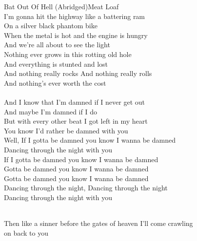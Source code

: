 \documentclass[a4paper,11pt]{article}
\begin{document}
\begin{song}{Bat Out Of Hell (Abridged)}{Meat Loaf}
 \\
I'm gonna hit the highway like a battering ram \\
On a silver black phantom bike \\
When the metal is hot and the engine is hungry \\
And we're all about to see the light \\
Nothing ever grows in this rotting old hole \\
And everything is stunted and lost \\
And nothing really rocks And nothing really rolls \\
And nothing's ever worth the cost\\
\\
And I know that I'm damned if I never get out \\
And maybe I'm damned if I do \\
But with every other beat I got left in my heart \\
You know I'd rather be damned with you\\ 
Well, If I gotta be damned you know I wanna be damned \\
Dancing through the night with you \\
If I gotta be damned you know I wanna be damned \\
Gotta be damned you know I wanna be damned \\
Gotta be damned you know I wanna be damned \\
Dancing through the night, Dancing through the night\\ 
 Dancing through the night with you \\
     \\

Then like a sinner before the gates of heaven I'll come crawling\\ on back to you
\end{song}
\end{document}
